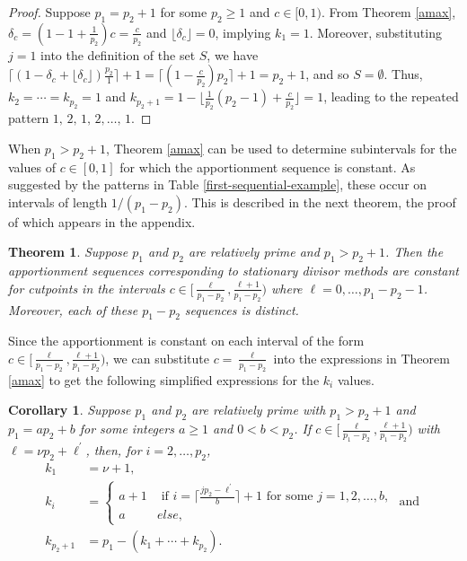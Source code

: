 \documentclass[pdflatex,sn-mathphys-num]{sn-jnl}
\theoremstyle{thmstyleone}%
\newtheorem{theorem}{Theorem}%
\newtheorem{corollary}{Corollary}
\theoremstyle{thmstyletwo}%
\theoremstyle{thmstylethree}%
\begin{document}
\begin{proof} Suppose $p_1=p_2+1$ for some $p_2 \ge 1$ and $c \in [0, 1)$. From Theorem \ref{amax}, $\delta_c = (1-1+\frac{1}{p_2})c = \frac{c}{p_2}$ and $\lfloor \delta_c \rfloor  = 0$, implying $k_1=1$. Moreover,  substituting $j=1$ into the definition of the set $S$, we have  $ \lceil (1- \delta_c+\lfloor \delta_c \rfloor)\frac{p_2}{1}\rceil+1 =\lceil (1- \frac{c}{p_2})p_2 \rceil + 1 = p_2 + 1$, and so $S= \emptyset.$  Thus, $k_2= \cdots = k_{p_2}=1$ and $k_{p_2+1} = 1-\lfloor \frac{1}{p_2}(p_2-1)+\frac{c}{p_2} \rfloor = 1$, leading to the repeated pattern $1, \, 2, \, 1, \, 2, \ldots, \, 1$.
\end{proof}

When $p_1>p_2+1$, Theorem \ref{amax} can be used to determine subintervals for the values of $c \in [0, 1]$ for which the apportionment sequence is constant. As suggested by the patterns in Table \ref{first-sequential-example}, these occur on intervals of length $1/(p_1-p_2)$.  This is described in the next theorem, the proof of which appears in the appendix.

\begin{theorem}\label{constant_intervals}
Suppose $p_1$ and $p_2$  are relatively prime and $p_1>p_2+1$. Then the apportionment sequences  corresponding to stationary divisor methods are constant for  cutpoints in  the intervals  $c \in  [\frac{\ell}{p_1-p_2}, \frac{\ell+1}{p_1-p_2})$ where $\ell= 0, \ldots, p_{1}-p_2-1$.  Moreover, each of these $p_1-p_2$ sequences is distinct.
\end{theorem}

Since the apportionment is constant on each interval of the form $c \in [\frac{\ell}{p_1-p_2}, \frac{\ell+1}{p_1-p_2})$, we can substitute $c=\frac{\ell}{p_1-p_2}$ into the expressions in Theorem \ref{amax}  to get the following simplified expressions for the $k_i$ values.

\begin{corollary}\label{corsimple}
Suppose  $p_1$ and $p_2$ are relatively prime with   $p_1>p_2+1$ and $p_1=ap_2+b$ for some integers $a \ge 1$ and $0< b <p_2$. If $c \in [\frac{\ell}{p_1-p_2}, \frac{\ell+1}{p_1-p_2})$ with $\ell = \nu p_2+\ell^\prime$, then, for $i=2, \ldots, p_2$,  \begin{align*}
k_1 & = \nu+1, \\
k_i  & =\left\{ \begin{array}{cl} a+1 & \mbox{ if } i = \lceil \frac{jp_2-\ell^\prime}{b} \rceil +1 \mbox{ for  some } j = 1, 2, \ldots, b, \\
a & else,  \end{array} \right. \text{ and }\\
k_{p_2+1}& = p_1-(k_1+ \cdots + k_{p_2}).
\end{align*}
\end{corollary}
\end{document}
